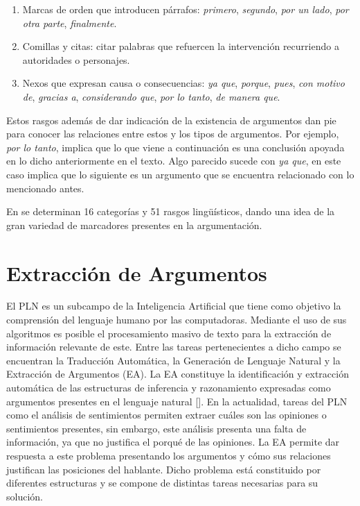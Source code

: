 \begin{enumerate}
    \item Marcas de orden que introducen párrafos: \emph{primero}, \emph{segundo}, \emph{por un lado}, 
    \emph{por otra parte}, \emph{finalmente}.
    \item Comillas y citas: citar palabras que refuercen la intervención recurriendo a autoridades
    o personajes.
    \item Nexos que expresan causa o consecuencias: \emph{ya que}, \emph{porque}, \emph{pues}, 
    \emph{con motivo de}, \emph{gracias a}, \emph{considerando que}, \emph{por lo tanto}, \emph{de manera que}.
\end{enumerate}

Estos rasgos además de dar indicación de la existencia de argumentos dan pie para conocer las relaciones
entre estos y los tipos de argumentos. Por ejemplo, \emph{por lo tanto}, implica que lo que viene 
a continuación es una conclusión apoyada en lo dicho anteriormente en el texto. Algo parecido
sucede con \emph{ya que}, en este caso implica que lo siguiente es un argumento que se encuentra 
relacionado con lo mencionado antes.

En
\textcite{venegas2005hacia}
se determinan 16 categorías y 51 rasgos lingüísticos, dando una idea 
de la gran variedad de marcadores presentes en la argumentación.

\section{Extracción de Argumentos}

El PLN es un subcampo de la Inteligencia Artificial que tiene como objetivo la comprensión 
del lenguaje humano por las computadoras. 
Mediante el uso de sus algoritmos es posible el procesamiento masivo de texto para la extracción de información 
relevante de este. Entre las tareas pertenecientes a dicho campo se encuentran la Traducción Automática, 
la Generación de Lenguaje Natural y la Extracción de Argumentos (EA). La EA constituye la identificación y extracción 
automática de las estructuras de inferencia y 
razonamiento expresadas como argumentos presentes en el lenguaje natural [\cite{lawrence2020argument}].
En la actualidad, tareas del PLN como el análisis de sentimientos permiten 
extraer cuáles son las opiniones o sentimientos presentes, sin embargo, este análisis presenta una falta 
de información, ya que no justifica el porqué de las opiniones. La EA permite dar respuesta a este problema presentando
los argumentos y cómo sus relaciones justifican las posiciones del hablante. Dicho problema está constituido por diferentes 
estructuras y se compone de distintas tareas necesarias para su solución.

